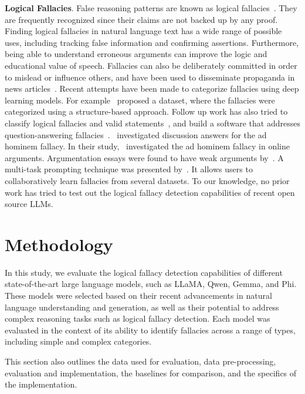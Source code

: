 \documentclass[runningheads]{llncs}
\begin{document}
\textbf{Logical Fallacies}. False reasoning patterns are known as logical fallacies~\cite{fantino2003logical}. They are frequently recognized since their claims are not backed up by any proof. Finding logical fallacies in natural language text has a wide range of possible uses, including tracking false information and confirming assertions. Furthermore, being able to understand erroneous arguments can improve the logic and educational value of speech. Fallacies can also be deliberately committed in order to mislead or influence others, and have been used to disseminate propaganda in news articles~\cite{musi2022developing}. Recent attempts have been made to categorize fallacies using deep learning models. For example~\cite{jin2022logical} proposed a dataset, where the fallacies were categorized using a structure-based approach. Follow up work has also tried to classify logical fallacies and valid statements~\cite{lalwaniexplainnli}, and build a software that addresses question-answering fallacies~\cite{habernal2017argotario}.~\cite{sheng2020nice} investigated discussion answers for the ad hominem fallacy. In their study,~\cite{habernal2018before} investigated the ad hominem fallacy in online arguments. Argumentation essays were found to have weak arguments by~\cite{stab2017recognizing}. A multi-task prompting technique was presented by~\cite{alhindi2023multitask}. It allows users to collaboratively learn fallacies from several datasets. To our knowledge, no prior work has tried to test out the logical fallacy detection capabilities of recent open source LLMs.  

\section{Methodology}
In this study, we evaluate the logical fallacy detection capabilities of different state-of-the-art large language models, such as LLaMA, Qwen, Gemma, and Phi. These models were selected based on their recent advancements in natural language understanding and generation, as well as their potential to address complex reasoning tasks such as logical fallacy detection. Each model was evaluated in the context of its ability to identify fallacies across a range of types, including simple and complex categories.

This section also outlines the data used for evaluation, data pre-processing, evaluation and implementation,  the baselines for comparison, and the specifics of the implementation.
\end{document}
